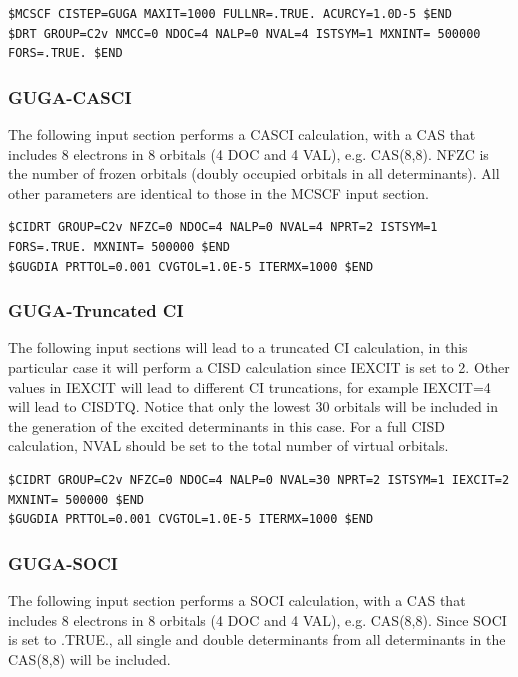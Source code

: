 \begin{lstlisting}
$MCSCF CISTEP=GUGA MAXIT=1000 FULLNR=.TRUE. ACURCY=1.0D-5 $END
$DRT GROUP=C2v NMCC=0 NDOC=4 NALP=0 NVAL=4 ISTSYM=1 MXNINT= 500000 FORS=.TRUE. $END
\end{lstlisting}

\subsubsection{GUGA-CASCI}
The following input section performs a CASCI calculation, with a CAS that includes 8
electrons in 8 orbitals (4 DOC and 4 VAL), e.g. CAS(8,8). NFZC is the number of frozen
orbitals (doubly occupied orbitals in all determinants). All other parameters are identical
to those in the MCSCF input section.

\begin{lstlisting}
$CIDRT GROUP=C2v NFZC=0 NDOC=4 NALP=0 NVAL=4 NPRT=2 ISTSYM=1 FORS=.TRUE. MXNINT= 500000 $END
$GUGDIA PRTTOL=0.001 CVGTOL=1.0E-5 ITERMX=1000 $END
\end{lstlisting}

\subsubsection{GUGA-Truncated CI}
The following input sections will lead to a truncated CI calculation, in this particular case
it will perform a CISD calculation since IEXCIT is set to 2. Other values in IEXCIT will lead
to different CI truncations, for example IEXCIT=4 will lead to CISDTQ. Notice that only
the lowest 30 orbitals will be included in the generation of the excited determinants in this
case. For a full CISD calculation, NVAL should be set to the total number of virtual orbitals.

\begin{lstlisting}
$CIDRT GROUP=C2v NFZC=0 NDOC=4 NALP=0 NVAL=30 NPRT=2 ISTSYM=1 IEXCIT=2 MXNINT= 500000 $END
$GUGDIA PRTTOL=0.001 CVGTOL=1.0E-5 ITERMX=1000 $END
\end{lstlisting}

\subsubsection{GUGA-SOCI}
The following input section performs a SOCI calculation, with a CAS that includes 8
electrons in 8 orbitals (4 DOC and 4 VAL), e.g. CAS(8,8). Since SOCI is set to .TRUE.,
all single and double determinants from all determinants in the CAS(8,8) will be included.

